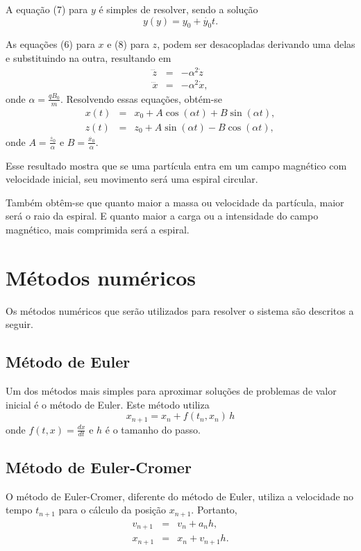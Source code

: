 \documentclass[brazilian, 12pt, a4paper, final]{article}
\begin{document}
\begin{multicols*}{2}
A equação (7) para $y$ é simples de resolver, sendo a solução
\begin{equation} \label{eq:y}
	y(y)=y_0+\dot{y_0}t.
\end{equation}

As equações (6) para $x$ e (8) para $z$, podem ser desacopladas derivando uma delas e substituindo na outra, resultando em
\begin{eqnarray}
	\dddot{z}&=&-\alpha^2\dot{z} \\
	\dddot{x}&=&-\alpha^2\dot{x},
\end{eqnarray}
onde $\alpha=\frac{qB_0}{m}$.
Resolvendo essas equações, obtém-se
\begin{eqnarray}
	x(t)&=&x_0+A\cos(\alpha t)+B\sin(\alpha t), \\
	z(t)&=&z_0+A\sin(\alpha t)-B\cos(\alpha t),
\end{eqnarray}
onde $A=\frac{\dot{z_0}}{\alpha}$ e $B=\frac{\dot{x_0}}{\alpha}$.

Esse resultado mostra que se uma partícula entra em um campo magnético com velocidade inicial, seu movimento será uma espiral circular. 

Também obtêm-se que quanto maior a massa ou velocidade da partícula, maior será o raio da espiral. E quanto maior a carga ou a intensidade do campo magnético, mais comprimida será a espiral.

\section{Métodos numéricos}

Os métodos numéricos que serão utilizados para resolver o sistema são descritos a seguir.

\subsection{Método de Euler}
Um dos métodos mais simples para aproximar soluções de problemas de valor inicial é o método de Euler. Este método utiliza
\begin{equation}
x_{n+1}=x_n+f(t_n,x_n)\,h
\end{equation}
\noindent
onde $f(t,x)=\frac{dx}{dt}$ e $h$ é o tamanho do passo.

\subsection{Método de Euler-Cromer}
O método de Euler-Cromer, diferente do método de Euler, utiliza a velocidade no tempo $t_{n+1}$ para o cálculo da posição $x_{n+1}$.
Portanto,
\begin{eqnarray}
  v_{n+1}&=&v_n+a_nh, \\
  x_{n+1}&=&x_n+v_{n+1}h.
\end{eqnarray}


\end{multicols*}
\end{document}
